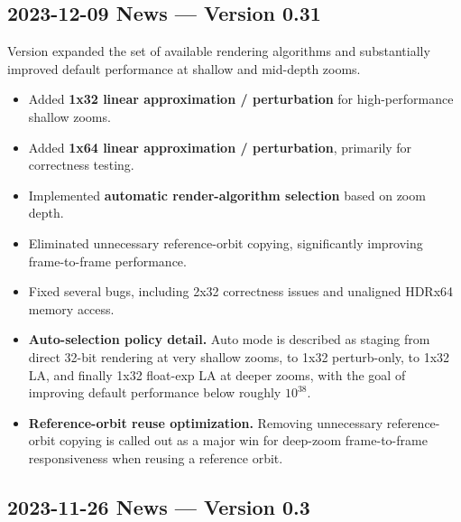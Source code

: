 \subsection{2023-12-09 News --- Version 0.31}

Version  expanded the set of available rendering algorithms and
substantially improved default performance at shallow and mid-depth zooms.

\begin{itemize}
  \item Added \textbf{1x32 linear approximation / perturbation} for
  high-performance shallow zooms.
  
  \item Added \textbf{1x64 linear approximation / perturbation}, primarily for
  correctness testing.
  
  \item Implemented \textbf{automatic render-algorithm selection} based on zoom
  depth.
  
  \item Eliminated unnecessary reference-orbit copying, significantly improving
  frame-to-frame performance.
  
  \item Fixed several bugs, including 2x32 correctness issues and unaligned
  HDRx64 memory access.

  \item \textbf{Auto-selection policy detail.} Auto mode is described as staging
  from direct 32-bit rendering at very shallow zooms, to 1x32 perturb-only, to
  1x32 LA, and finally 1x32 float-exp LA at deeper zooms, with the goal of
  improving default performance below roughly $10^{38}$.

  \item \textbf{Reference-orbit reuse optimization.} Removing unnecessary
  reference-orbit copying is called out as a major win for deep-zoom
  frame-to-frame responsiveness when reusing a reference orbit.

\end{itemize}


\subsection{2023-11-26 News --- Version 0.3}

